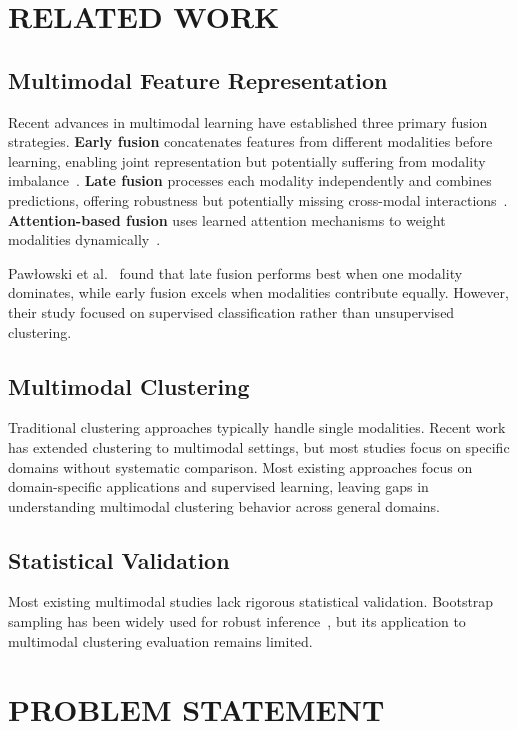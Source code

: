 \documentclass[sigconf]{acmart}
\begin{document}
\section{RELATED WORK}

\subsection{Multimodal Feature Representation}

Recent advances in multimodal learning have established three primary fusion strategies. \textbf{Early fusion} concatenates features from different modalities before learning, enabling joint representation but potentially suffering from modality imbalance~\cite{baltruvsaitis2018multimodal}. \textbf{Late fusion} processes each modality independently and combines predictions, offering robustness but potentially missing cross-modal interactions~\cite{ramachandram2017deep}. \textbf{Attention-based fusion} uses learned attention mechanisms to weight modalities dynamically~\cite{atrey2010multimodal}.

Pawłowski et al.~\cite{pawlowski2023effective} found that late fusion performs best when one modality dominates, while early fusion excels when modalities contribute equally. However, their study focused on supervised classification rather than unsupervised clustering.

\subsection{Multimodal Clustering}

Traditional clustering approaches typically handle single modalities. Recent work has extended clustering to multimodal settings, but most studies focus on specific domains without systematic comparison. Most existing approaches focus on domain-specific applications and supervised learning, 
leaving gaps in understanding multimodal clustering behavior across general domains.

\subsection{Statistical Validation}

Most existing multimodal studies lack rigorous statistical validation. Bootstrap sampling has been widely used for robust inference~\cite{efron1979bootstrap}, but its application to multimodal clustering evaluation remains limited.

\section{PROBLEM STATEMENT}
\end{document}
